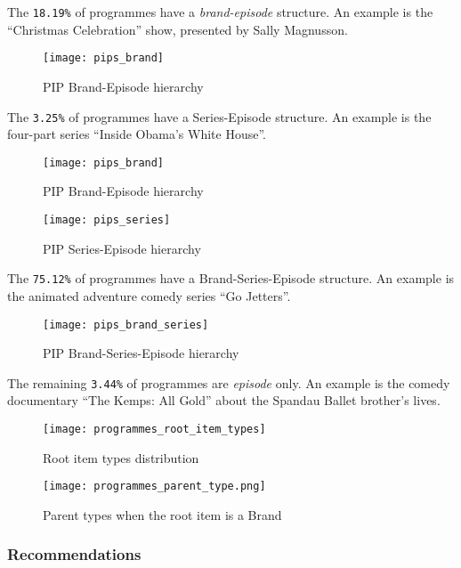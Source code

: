The \verb|18.19%| of programmes have a \textit{brand-episode} structure.
An example is the ``Christmas Celebration'' show, presented by Sally Magnusson.

\begin{figure}[H]
  \centering
  \texttt{[image: pips\_brand]}
  \caption{PIP Brand-Episode hierarchy}
  \label{fig:pips_brand}
\end{figure}

The \verb|3.25%| of programmes have a Series-Episode structure.
An example is the four-part series ``Inside Obama's White House''.

\begin{figure}[H]
  \centering
  \texttt{[image: pips\_brand]}
  \caption{PIP Brand-Episode hierarchy}
  \label{fig:pips_brand}
\end{figure}

\begin{figure}[H]
  \centering
  \texttt{[image: pips\_series]}
  \caption{PIP Series-Episode hierarchy}
  \label{fig:pips_series}
\end{figure}

The \verb|75.12%| of programmes have a Brand-Series-Episode structure.
An example is the animated adventure comedy series ``Go Jetters''.

\begin{figure}[H]
  \centering
  \texttt{[image: pips\_brand\_series]}
  \caption{PIP Brand-Series-Episode hierarchy}
  \label{fig:pips_brand_series}
\end{figure}

The remaining \verb|3.44%| of programmes are \textit{episode} only.
An example is the comedy documentary ``The Kemps: All Gold'' about the Spandau Ballet brother's lives.

\begin{figure}[H]
  \centering
  \texttt{[image: programmes\_root\_item\_types]}
  \caption{Root item types distribution}
  \label{fig:programmes_root_item_types}
\end{figure}

\begin{figure}[H]
  \centering
  \texttt{[image: programmes\_parent\_type.png]}
  \caption{Parent types when the root item is a Brand}
  \label{fig:programmes_parent_type}
\end{figure}

\subsubsection{Recommendations}


